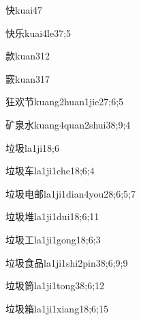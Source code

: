 \begin{verbete}{快}{kuai4}{7}
\end{verbete}
\begin{verbete}{快乐}{kuai4le3}{7;5}
\end{verbete}
\begin{verbete}{款}{kuan3}{12}
\end{verbete}
\begin{verbete}{窾}{kuan3}{17}
\end{verbete}
\begin{verbete}{狂欢节}{kuang2huan1jie2}{7;6;5}
\end{verbete}
\begin{verbete}{矿泉水}{kuang4quan2shui3}{8;9;4}
\end{verbete}
\begin{verbete}{垃圾}{la1ji1}{8;6}
\end{verbete}
\begin{verbete}{垃圾车}{la1ji1che1}{8;6;4}
\end{verbete}
\begin{verbete}{垃圾电邮}{la1ji1dian4you2}{8;6;5;7}
\end{verbete}
\begin{verbete}{垃圾堆}{la1ji1dui1}{8;6;11}
\end{verbete}
\begin{verbete}{垃圾工}{la1ji1gong1}{8;6;3}
\end{verbete}
\begin{verbete}{垃圾食品}{la1ji1shi2pin3}{8;6;9;9}
\end{verbete}
\begin{verbete}{垃圾筒}{la1ji1tong3}{8;6;12}
\end{verbete}
\begin{verbete}{垃圾箱}{la1ji1xiang1}{8;6;15}
\end{verbete}

